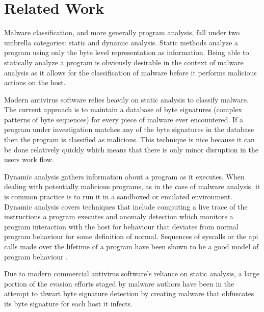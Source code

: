 \chapter{Related Work}

    Malware classification, and more generally program analysis, fall under two
    umbrella categories: static and dynamic analysis. Static methods analyze a
    program using only the byte level representation as information. Being able
    to statically analyze a program is obviously desirable in the context of
    malware analysis as it allows for the classification of malware before it
    performs malicious actions on the host.
    
    Modern antivirus software relies heavily on static analysis to classify
    malware. The current approach is to maintain a database of byte signatures
    (complex patterns of byte sequences) for every piece of malware ever
    encountered. If a program under investigation matches any of the byte
    signatures in the database then the program is classified as malicious.
    This technique is nice because it can be done relatively quickly which means
    that there is only minor disruption in the users work flow.

    Dynamic analysis gathers information about a program as it executes. When
    dealing with potentially malicious programs, as in the case of malware
    analysis, it is common practice is to run it in a sandboxed or emulated
    environment. Dynamic analysis covers techniques that include computing a
    live trace of the instructions a program executes and anomaly detection
    which monitors a program interaction with the host for behaviour that
    deviates from normal program behaviour for some definition of normal.
    Sequences of syscalls or the api calls made over the lifetime of a program
    have been shown to be a good model of program behaviour \cite{api_calls}.

    Due to modern commercial antivirus software's reliance on static analysis,
    a large portion of the evasion efforts staged by malware authors have been
    in the attempt to thwart byte signature detection by creating malware that
    obfuscates its byte signature for each host it infects.

